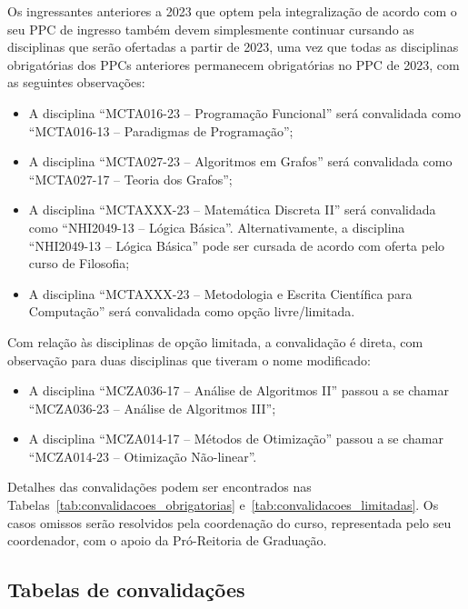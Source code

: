 Os ingressantes anteriores a 2023 que optem pela integralização de acordo com o
seu PPC de ingresso também devem simplesmente continuar cursando as disciplinas
que serão ofertadas a partir de 2023, uma vez que todas as disciplinas
obrigatórias dos PPCs anteriores permanecem obrigatórias no PPC de 2023, com as
seguintes observações:
\begin{itemize}
    \item A disciplina ``MCTA016-23 -- Programação Funcional'' será convalidada
    como ``MCTA016-13 -- Paradigmas de Programação'';
    \item A disciplina ``MCTA027-23 -- Algoritmos em Grafos'' será convalidada
    como ``MCTA027-17 -- Teoria dos Grafos'';
    \item A disciplina ``MCTAXXX-23 -- Matemática Discreta II'' será
    convalidada como ``NHI2049-13 -- Lógica Básica''.  Alternativamente, a
    disciplina ``NHI2049-13 -- Lógica Básica'' pode ser cursada de acordo com
    oferta pelo curso de Filosofia;
    \item A disciplina ``MCTAXXX-23 -- Metodologia e Escrita Científica para
    Computação'' será convalidada como opção livre/limitada.
\end{itemize}
Com relação às disciplinas de opção limitada, a convalidação é direta, com
observação para duas disciplinas que tiveram o nome modificado:
\begin{itemize}
    \item A disciplina ``MCZA036-17 -- Análise de Algoritmos II'' passou a se
    chamar ``MCZA036-23 -- Análise de Algoritmos III'';
    \item A disciplina ``MCZA014-17 -- Métodos de Otimização'' passou a se
    chamar ``MCZA014-23 -- Otimização Não-linear''.
\end{itemize}

Detalhes das convalidações podem ser encontrados nas
Tabelas~\ref{tab:convalidacoes_obrigatorias}
e~\ref{tab:convalidacoes_limitadas}.
Os casos omissos serão resolvidos pela coordenação do curso, representada pelo
seu coordenador, com o apoio da Pró-Reitoria de Graduação.


\newpage

\subsection{Tabelas de convalidações}
\label{subsec:convalidacoes}

